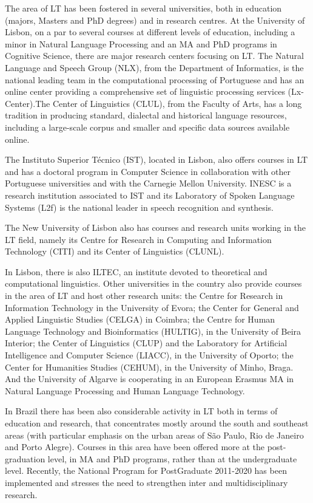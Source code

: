 \begin{multicols}{2}
    The area of LT has been fostered in several universities, both in education (majors, Masters and PhD degrees) and in research centres. At the University of Lisbon, on a par to several courses at different levels of education, including a minor in Natural Language Processing and an MA and PhD programs in Cognitive Science, there are major research centers focusing on LT. The Natural Language and Speech Group (NLX), from the Department of Informatics, is the national leading team in the computational processing of Portuguese and has an online center providing a comprehensive set of linguistic processing services (Lx-Center).The Center of Linguistics (CLUL), from the Faculty of Arts, has a long tradition in producing standard, dialectal and historical language resources, including a large-scale corpus and smaller and specific data sources available online. 

The Instituto Superior Técnico (IST), located in Lisbon, also offers courses in LT and has a doctoral program in Computer Science in collaboration with other Portuguese universities and with the Carnegie Mellon University. INESC is a research institution associated to IST and its Laboratory of Spoken Language Systems (L2f) is the national leader in speech recognition and synthesis. 

The New University of Lisbon also has courses and research units working in the LT field, namely its Centre for Research in Computing and Information Technology (CITI) and its Center of Linguistics (CLUNL). 

In Lisbon, there is also ILTEC, an institute devoted to theoretical and computational linguistics. Other universities in the country also provide courses in the area of LT and host other research units: the Centre for Research in Information Technology in the University of Evora; the Center for General and Applied Linguistic Studies (CELGA) in Coimbra; the Centre for Human Language Technology and Bioinformatics (HULTIG), in the University of Beira Interior; the Center of Linguistics (CLUP) and the Laboratory for Artificial Intelligence and Computer Science (LIACC), in the University of Oporto; the Center for Humanities Studies (CEHUM), in the University of Minho, Braga. And the University of Algarve is cooperating in an European Erasmus MA in Natural Language Processing and Human Language Technology.

In Brazil there has been also considerable activity in LT both in terms of education and research, that concentrates mostly around  the south and southeast areas (with particular emphasis on the urban areas of São Paulo, Rio de Janeiro and Porto Alegre). Courses in this area have been offered more at the post-graduation level, in MA and PhD programs, rather than at the undergraduate level. Recently, the National Program for PostGraduate 2011-2020 has been implemented and stresses the need to strengthen inter and multidisciplinary research.


\end{multicols}

